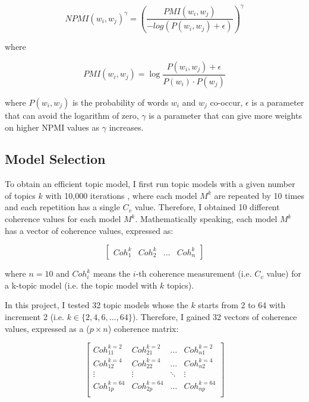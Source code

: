 \begin{equation}
  NPMI(w_i, w_j)^{\gamma} = \left(\frac{PMI(w_i, w_j)}{-log(P(w_i, w_j) + \epsilon)}\right)^{\gamma}
\end{equation}

where

\begin{equation}
PMI(w_i, w_j) = \log\frac{P(w_i, w_j) + \epsilon}{P(w_i) \cdot P(w_j)}
\end{equation}

where $P(w_i, w_j)$ is the probability of words $w_i$ and $w_j$ co-occur, $\epsilon$ is a parameter that can avoid the logarithm of zero, $\gamma$ is a parameter that can give more weights on higher NPMI values as $\gamma$ increases.

\subsection{Model Selection}

To obtain an efficient topic model, I first run topic models with a given number of topics $k$ with 10,000 iterations \cite{mariana2017}, where each model $M^k$ are repeated by 10 times and each repetition has a single $C_v$ value. Therefore, I obtained 10 different coherence values for each model $M^k$. Mathematically speaking, each model $M^k$ has a vector of coherence values, expressed as:

\begin{equation}
  \begin{bmatrix} Coh^{k}_{1} & Coh^{k}_{2} & \dots & Coh^{k}_{n} \end{bmatrix}
\end{equation}

where $n = 10$ and $Coh^{k}_{i}$ means the $i$-th coherence measurement (i.e. $C_v$ value) for a k-topic model (i.e. the topic model with $k$ topics).

In this project, I tested 32 topic models whose the $k$ starts from 2 to 64 with increment 2 (i.e. $k \in \{ 2,4,6,...,64 \} $). Therefore, I gained 32 vectors of coherence values, expressed as a ($p \times n$) coherence matrix:

\begin{equation}
  \begin{bmatrix}
  Coh^{k = 2}_{11} & Coh^{k = 2}_{21} & \dots & Coh^{k = 2}_{n1} \\
  Coh^{k = 4}_{12} & Coh^{k = 4}_{22} & \dots & Coh^{k = 4}_{n2} \\
  \vdots & \vdots & \ddots & \vdots \\
  Coh^{k = 64}_{1p} & Coh^{k = 64}_{2p} & \dots & Coh^{k = 64}_{np} \\
  \end{bmatrix}
\end{equation}

